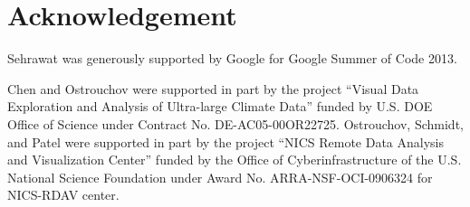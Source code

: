 
\section*{Acknowledgement}
Sehrawat was generously supported by Google for Google Summer of Code 2013.

Chen and Ostrouchov were supported in part by the project
``Visual Data Exploration and Analysis of Ultra-large Climate Data''
funded by U.S. DOE Office of Science
under Contract No. DE-AC05-00OR22725.
Ostrouchov, Schmidt, and Patel were supported in part by the project
``NICS Remote Data Analysis and Visualization Center''
funded by the Office of Cyberinfrastructure of the
U.S. National Science Foundation
under Award No. ARRA-NSF-OCI-0906324 for NICS-RDAV center.

% 
% 
